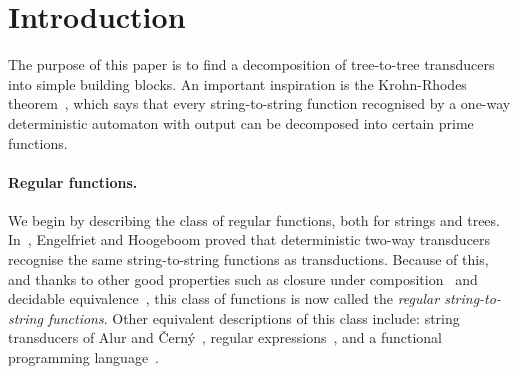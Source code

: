 
\section{Introduction}

The purpose of this paper is to find a decomposition of tree-to-tree transducers into simple building blocks. An important inspiration  is the Krohn-Rhodes theorem~\cite[p.~454]{Krohn1965}, which says that every string-to-string function recognised by a  one-way deterministic automaton with output can be decomposed into certain prime functions. 

\paragraph*{Regular functions.} We begin by describing the class of regular functions, both for strings and trees. In~\cite[Theorem 13]{engelfrietMSODefinableString2001}, Engelfriet and Hoogeboom proved that deterministic two-way transducers recognise the same string-to-string functions as \mso transductions. Because of this, and thanks to other good properties such as closure under composition~\cite[Theorem 1]{chytilSerialComposition2Way1977} and decidable equivalence~\cite[Theorem 1]{gurariEquivalenceProblemDeterministic1982}, this class of functions is now called the \emph{regular string-to-string functions}. Other  equivalent descriptions of this class include: string transducers of Alur and {\v C}ern{\'y}~\cite{alurStreamingStringTransducers2011}, regular expressions~\cite{alur2014regular,daveGastinKrishna18}, and a functional programming language~\cite{bojanczykRegularFirstOrderList2018}. 


